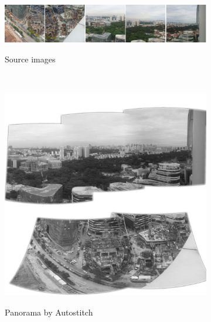 \begin{figure}[h]
	\begin{subfigure}[t]{0.9\textwidth}
		\centering
        \includegraphics[width=\textwidth]{images/pano_wide}
        \label{fig:pano_images}
		\caption{Source images}
    \end{subfigure}%
	\\
	\centering
    \begin{subfigure}[b]{0.4\textwidth}
		\includegraphics[width=\textwidth]{images/panorama-autostitch}
        \label{fig:pano_autostitch}
		\caption{Panorama by Autostitch}
    \end{subfigure}%
	~%
    \begin{subfigure}[b]{0.4\textwidth}

\end{subfigure}
\end{figure}
